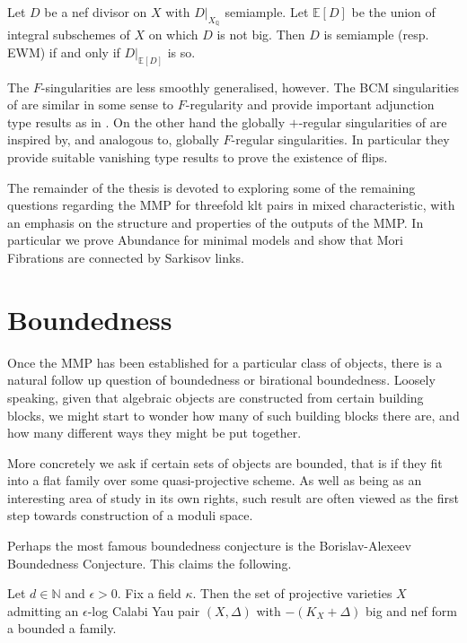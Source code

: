 \documentclass[a4paper,12pt]{book}
\begin{document}
	\begin{theorem*}\cite[Theorem 1.2]{witaszek2020keels}
		Let $D$ be a nef divisor on $X$ with $D|_{X_{\mathbb{Q}}}$ semiample. Let $\mathbb{E}[D]$ be the union of integral subschemes of $X$ on which $D$ is not big. Then $D$ is semiample (resp. EWM) if and only if $D|_{\mathbb{E}[D]}$ is so.
	\end{theorem*}
	
	The $F$-singularities are less smoothly generalised, however. The BCM singularities of \cite{} are similar in some sense to $F$-regularity and provide important adjunction type results as in \cite{}. On the other hand the globally $+$-regular singularities of \cite{} are inspired by, and analogous to, globally $F$-regular singularities. In particular they provide suitable vanishing type results to prove the existence of flips. 
	
	The remainder of the thesis is devoted to exploring some of the remaining questions regarding the MMP for threefold klt pairs in mixed characteristic, with an emphasis on the structure and properties of the outputs of the MMP. In particular we prove Abundance for minimal models and show that Mori Fibrations are connected by Sarkisov links.	
	
	\section{Boundedness}
	
	Once the MMP has been established for a particular class of objects, there is a natural follow up question of boundedness or birational boundedness. Loosely speaking, given that algebraic objects are constructed from certain building blocks, we might start to wonder how many of such building blocks there are, and how many different ways they might be put together.
	
	More concretely we ask if certain sets of objects are bounded, that is if they fit into a flat family over some quasi-projective scheme. As well as being as an interesting area of study in its own rights, such result are often viewed as the first step towards construction of a moduli space.
	
	Perhaps the most famous boundedness conjecture is the Borislav-Alexeev Boundedness Conjecture. This claims the following.
	
	\begin{conjecture*}
		Let $d \in \mathbb{N}$ and $\epsilon > 0$. Fix a field $\kappa$. Then the set of projective varieties $X$ admitting an $\epsilon$-log Calabi Yau pair $(X,\Delta)$ with $-(K_{X}+\Delta)$ big and nef form a bounded a family.
	\end{conjecture*}	
	
\end{document}
